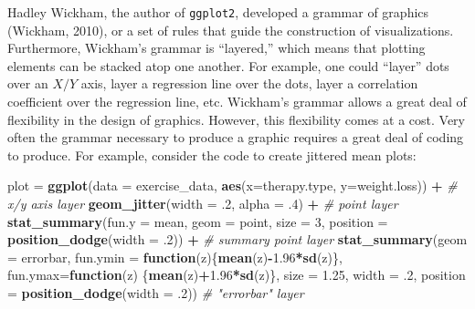 \documentclass[
  english,
  man]{apa6}
\newenvironment{Shaded}{\begin{snugshade}}{\end{snugshade}}
\newcommand{\CommentTok}[1]{\textcolor[rgb]{0.56,0.35,0.01}{\textit{#1}}}
\newcommand{\ControlFlowTok}[1]{\textcolor[rgb]{0.13,0.29,0.53}{\textbf{#1}}}
\newcommand{\DataTypeTok}[1]{\textcolor[rgb]{0.13,0.29,0.53}{#1}}
\newcommand{\DecValTok}[1]{\textcolor[rgb]{0.00,0.00,0.81}{#1}}
\newcommand{\FloatTok}[1]{\textcolor[rgb]{0.00,0.00,0.81}{#1}}
\newcommand{\KeywordTok}[1]{\textcolor[rgb]{0.13,0.29,0.53}{\textbf{#1}}}
\newcommand{\NormalTok}[1]{#1}
\newcommand{\OperatorTok}[1]{\textcolor[rgb]{0.81,0.36,0.00}{\textbf{#1}}}
\newcommand{\StringTok}[1]{\textcolor[rgb]{0.31,0.60,0.02}{#1}}
\begin{document}
Hadley Wickham, the author of \texttt{ggplot2}, developed a grammar of graphics (Wickham, 2010), or a set of rules that guide the construction of visualizations. Furthermore, Wickham's grammar is ``layered,'' which means that plotting elements can be stacked atop one another. For example, one could ``layer'' dots over an \(X/Y\) axis, layer a regression line over the dots, layer a correlation coefficient over the regression line, etc. Wickham's grammar allows a great deal of flexibility in the design of graphics. However, this flexibility comes at a cost. Very often the grammar necessary to produce a graphic requires a great deal of coding to produce. For example, consider the code to create jittered mean plots:

\small

\begin{Shaded}
\begin{Highlighting}[]
\NormalTok{plot =}\StringTok{ }\KeywordTok{ggplot}\NormalTok{(}\DataTypeTok{data =}\NormalTok{ exercise\_data, }\KeywordTok{aes}\NormalTok{(}\DataTypeTok{x=}\NormalTok{therapy.type, }\DataTypeTok{y=}\NormalTok{weight.loss)) }\OperatorTok{+}\StringTok{ }
\StringTok{      }\CommentTok{\# x/y axis layer}
\StringTok{  }\KeywordTok{geom\_jitter}\NormalTok{(}\DataTypeTok{width =} \FloatTok{.2}\NormalTok{, }\DataTypeTok{alpha =} \FloatTok{.4}\NormalTok{) }\OperatorTok{+}\StringTok{ }
\StringTok{      }\CommentTok{\# point layer}
\StringTok{  }\KeywordTok{stat\_summary}\NormalTok{(}\DataTypeTok{fun.y =} \StringTok{\textquotesingle{}mean\textquotesingle{}}\NormalTok{, }\DataTypeTok{geom =} \StringTok{\textquotesingle{}point\textquotesingle{}}\NormalTok{, }
        \DataTypeTok{size =} \DecValTok{3}\NormalTok{, }\DataTypeTok{position =} \KeywordTok{position\_dodge}\NormalTok{(}\DataTypeTok{width =} \FloatTok{.2}\NormalTok{)) }\OperatorTok{+}\StringTok{ }
\StringTok{      }\CommentTok{\# summary point layer}
\StringTok{  }\KeywordTok{stat\_summary}\NormalTok{(}\DataTypeTok{geom =} \StringTok{\textquotesingle{}errorbar\textquotesingle{}}\NormalTok{, }\DataTypeTok{fun.ymin =} \ControlFlowTok{function}\NormalTok{(z)\{}\KeywordTok{mean}\NormalTok{(z)}\OperatorTok{{-}}\FloatTok{1.96}\OperatorTok{*}\KeywordTok{sd}\NormalTok{(z)\}, }
        \DataTypeTok{fun.ymax=}\ControlFlowTok{function}\NormalTok{(z) \{}\KeywordTok{mean}\NormalTok{(z)}\OperatorTok{+}\FloatTok{1.96}\OperatorTok{*}\KeywordTok{sd}\NormalTok{(z)\}, }
        \DataTypeTok{size =} \FloatTok{1.25}\NormalTok{, }\DataTypeTok{width =} \FloatTok{.2}\NormalTok{, }\DataTypeTok{position =} \KeywordTok{position\_dodge}\NormalTok{(}\DataTypeTok{width =} \FloatTok{.2}\NormalTok{))  }
      \CommentTok{\# "errorbar" layer}
\end{Highlighting}
\end{Shaded}
\end{document}
